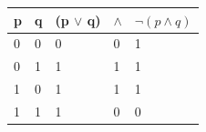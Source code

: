 \documentclass[12pt, fleqn]{article}                            %
\theoremstyle{break}                                            %
\begin{document}
\begin{tabular}{|l|l|l|l|l|} 
    \hline
    p & q  & (p $\vee$ q)  &$\wedge$ &$\neg(p \wedge q)$   \\ \hline
    0 & 0  &        0    &    0   & 1     \\ \hline 
    0 & 1  &        1    &    1   & 1    \\ \hline 
    1 & 0  &        1    &    1   & 1     \\ \hline 
    1 & 1  &        1    &    0   & 0     \\ \hline 
\end{tabular}















                
\end{document}
